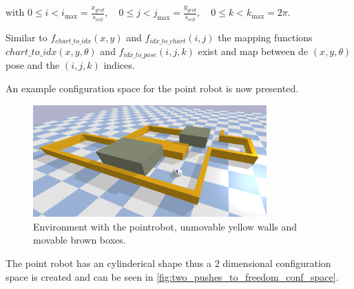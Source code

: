 with $0 \leq i < i_{\textrm{max}} = \frac{x_{\mathit{grid}}}{s_{\mathit{cell}}}, \quad 0 \leq j < j_{\textrm{max}} = \frac{y_{\mathit{grid}}}{s_{\mathit{cell}}}, \quad 0 \leq k < k_{\textrm{max}} = 2\pi$.\bs

Similar to $f_\mathit{chart\_to\_idx}(x, y)$ and $f_\mathit{idx\_to\_chart}(i,j)$ the mapping functions $\mathit{chart\_to\_idx}(x, y, \theta)$ and $f_\mathit{idx\_to\_pose}(i, j, k)$ exist and map between de $(x, y, \theta)$ pose and the $(i, j, k)$ indices.\bs

An example configuration space for the point robot is now presented.
\begin{figure}[H]
    \centering
    \includegraphics[width=0.8\textwidth]{figures/planning/two_push_to_freedom_env}
    \caption{Environment with the pointrobot, unmovable yellow walls and movable brown boxes.}%
    \label{fig:two_pushes_to_freedom_env}
\end{figure}

The point robot has an cylinderical shape thus a 2 dimensional configuration space is created and can be seen in \cref{fig:two_pushes_to_freedom_conf_space}.

